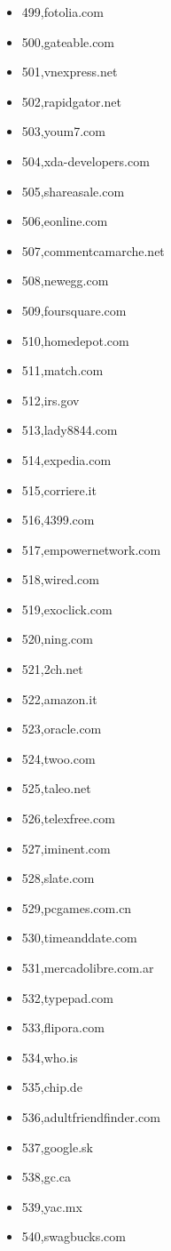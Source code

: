 \begin{multicols}{3}
\begin{itemize}
	\item 499,fotolia.com
	\item 500,gateable.com
	\item 501,vnexpress.net
	\item 502,rapidgator.net
	\item 503,youm7.com
	\item 504,xda-developers.com
	\item 505,shareasale.com
	\item 506,eonline.com
	\item 507,commentcamarche.net
	\item 508,newegg.com
	\item 509,foursquare.com
	\item 510,homedepot.com
	\item 511,match.com
	\item 512,irs.gov
	\item 513,lady8844.com
	\item 514,expedia.com
	\item 515,corriere.it
	\item 516,4399.com
	\item 517,empowernetwork.com
	\item 518,wired.com
	\item 519,exoclick.com
	\item 520,ning.com
	\item 521,2ch.net
	\item 522,amazon.it
	\item 523,oracle.com
	\item 524,twoo.com
	\item 525,taleo.net
	\item 526,telexfree.com
	\item 527,iminent.com
	\item 528,slate.com
	\item 529,pcgames.com.cn
	\item 530,timeanddate.com
	\item 531,mercadolibre.com.ar
	\item 532,typepad.com
	\item 533,flipora.com
	\item 534,who.is
	\item 535,chip.de
	\item 536,adultfriendfinder.com
	\item 537,google.sk
	\item 538,gc.ca
	\item 539,yac.mx
	\item 540,swagbucks.com

\end{itemize}
\end{multicols}
